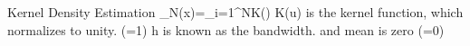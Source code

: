
Kernel Density Estimation
_N(x)=\sum_{i=1}^NK\left(\right)
K(u) is the kernel function, which normalizes to unity. (=1)
h is known as the bandwidth. and mean is zero (=0)

